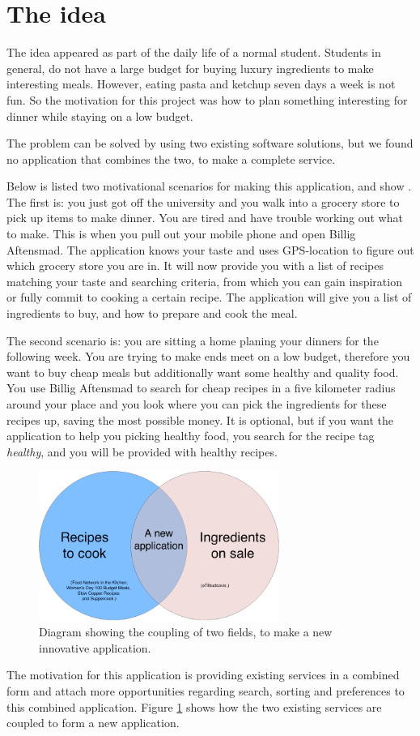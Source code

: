 \section{The idea}
\label{sec:theidea}

The idea appeared as part of the daily life of a normal student. Students in general, do not have a large budget for buying luxury ingredients to make interesting meals. However, eating pasta and ketchup seven days a week is not fun. So the motivation for this project was how to plan something interesting for dinner while staying on a low budget. 

The problem can be solved by using two existing software solutions, but we found no application that combines the two, to make a complete service.

Below is listed two motivational scenarios for making this application, and show . The first is: you just got off the university and you walk into a grocery store to pick up items to make dinner. You are tired and have trouble working out what to make. This is when you pull out your mobile phone and open Billig Aftensmad. The application knows your taste and uses GPS-location to figure out which grocery store you are in. It will now provide you with a list of recipes matching your taste and searching criteria, from which you can gain inspiration or fully commit to cooking a certain recipe. The application will give you a list of ingredients to buy, and how to prepare and cook the meal.

The second scenario is: you are sitting a home planing your dinners for the following week. You are trying to make ends meet on a low budget, therefore you want to buy cheap meals but additionally want some healthy and quality food. You use Billig Aftensmad to search for cheap recipes in a five kilometer radius around your place and you look where you can pick the ingredients for these recipes up, saving the most possible money. It is optional, but if you want the application to help you picking healthy food, you search for the recipe tag \textit{healthy}, and you will be provided with healthy recipes.

\begin{figure}[H]
	\centering
	\includegraphics[width=0.7\textwidth]{Pictures/theideadiagram.png}
	\caption{Diagram showing the coupling of two fields, to make a new innovative application.}
	\label{fig:theideaasdiagram}
\end{figure}

The motivation for this application is providing existing services in a combined form and attach more opportunities regarding search, sorting and preferences to this combined application. Figure \ref{fig:theideaasdiagram} shows how the two existing services are coupled to form a new application.